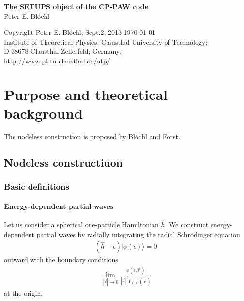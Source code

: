 \documentclass[11pt,a4paper]{report}
\begin{document}
\begin{titlepage}
\begin{center}
\vspace*{3.5cm}
{\huge \textbf{The SETUPS object of the CP-PAW code}}\\
\vspace{0.5cm}
{\large Peter E. Bl\"ochl}
\vspace{0.5cm} 
\end{center}

\vfill
\begin{center}
Copyright Peter E. Bl\"ochl; Sept.2, 2013-\today\\
{\small
Institute of Theoretical Physics;
Clausthal University of Technology;\\ 
D-38678 Clausthal Zellerfeld; Germany;\\
http://www.pt.tu-clausthal.de/atp/}
\end{center}
\end{titlepage}
\noindent            
\tableofcontents
\chapter{Purpose and theoretical background}
The nodeless construction is proposed by Bl\"ochl and
F\"orst\cite{bloechl12_arxiv1210_5937}.

\section{Nodeless constructiuon}
\subsection{Basic definitions}
\subsubsection{Energy-dependent partial waves}
Let us consider a spherical one-particle Hamiltonian $\hat{h}$. We
construct energy-dependent partial waves by radially integrating the
radial Schr\"odinger equation 
\begin{eqnarray}
(\hat{h}-\epsilon)|\phi(\epsilon)\rangle=0
\end{eqnarray}
outward with the boundary
conditions 
\begin{eqnarray}
\lim_{|\vec{r}|\rightarrow0}\frac{\phi(\epsilon,\vec{r})}
{|\vec{r}|^\ell Y_{\ell,m}(\vec{r})}
\end{eqnarray}
at the origin.
\end{document}
